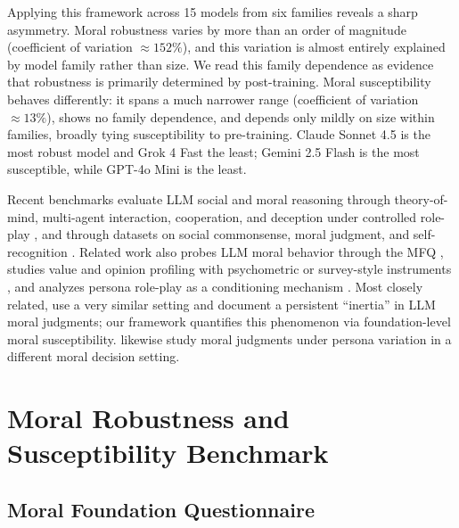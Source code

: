\documentclass{article}
\begin{document}

  

Applying this framework across 15 models from six families reveals a sharp asymmetry. Moral robustness varies by more than an order of magnitude (coefficient of variation $\approx 152\%$), and this variation is almost entirely explained by model family rather than size. We read this family dependence as evidence that robustness is primarily determined by post-training. Moral susceptibility behaves differently: it spans a much narrower range (coefficient of variation $\approx 13\%$), shows no family dependence, and depends only mildly on size within families, broadly tying susceptibility to pre-training. Claude Sonnet 4.5 is the most robust model and Grok 4 Fast the least; Gemini 2.5 Flash is the most susceptible, while GPT-4o Mini is the least.

Recent benchmarks evaluate LLM social and moral reasoning through theory-of-mind, multi-agent interaction, cooperation, and deception under controlled role-play \citep{zhou2024sotopia,pan2023machiavelli,bianchi2024negotiationarena,chen-etal-2024-tombench,costa2025deceivedetectdiscloselarge}, and through datasets on social commonsense, moral judgment, and self-recognition \citep{sap-etal-2019-social,hendrycks2021ethics,bai2025knowthyselfincapabilityimplications}. Related work also probes LLM moral behavior through the MFQ \citep{abdulhai-etal-2024-moral,nunes2024hypocrites,aksoy2024whose,bajpai2024insights,ji2025moralbenchmoralevaluationllms}, studies value and opinion profiling with psychometric or survey-style instruments \citep{pellert2024aipsychometrics,santurkar2023opinions,cahyawijaya2024highdimension}, and analyzes persona role-play as a conditioning mechanism \citep{tseng2024two,wang2023rolellm,kovac2024stick,samuel2025personagym,liu2024persona,xu2024character,elboudouri2025rpeval,bai2025concept}. Most closely related, \citet{lee2024inertia} use a very similar setting and document a persistent ``inertia'' in LLM moral judgments; our framework quantifies this phenomenon via foundation-level moral susceptibility. \citet{kim2025moralmachine} likewise study moral judgments under persona variation in a different moral decision setting.

\section{Moral Robustness and Susceptibility Benchmark}

\subsection{Moral Foundation Questionnaire}
\end{document}
